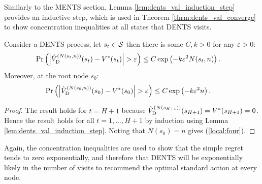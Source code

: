 











    
    
    Similarly to the MENTS section, Lemma \ref{lem:dents_val_induction_step} provides an inductive step, which is used in Theorem \ref{thrm:dents_val_converge} to show concentration inequalities at all states that DENTS visits.
        
    \begin{theorem} \label{thrm:dents_val_converge}
        Consider a DENTS process, let $s_t\in\mathcal{S}$ then there is some $C,k>0$ for any $\varepsilon>0$:
        \begin{align}
            \Pr\left(\left| {\hat{V}^{(N(s_{t},n))}_{{\textnormal{D}}}}(s_t) - V^*(s_{t}) \right| > \varepsilon \right) 
                &\leq C\exp\left( -k\varepsilon^2 N(s_{t},n) \right).
        \end{align}
        Moreover, at the root node $s_0$:
        \begin{align}
            \Pr\left(\left| {\hat{V}^{(N(s_{0},n))}_{{\textnormal{D}}}}(s_0) - V^*(s_0) \right| > \varepsilon \right) 
                &\leq C\exp\left( -k\varepsilon^2 n \right). \label{local:four}
        \end{align}
    \end{theorem}
    \begin{proof}
        The result holds for $t=H+1$  because ${\hat{V}^{(N(s_{H+1}))}_{{\textnormal{D}}}}(s_{H+1})=V^*(s_{H+1})=0$.  Hence the result holds for all $t=1,...,H+1$ by induction using Lemma \ref{lem:dents_val_induction_step}. Noting that $N(s_0)=n$ gives (\ref{local:four}).
    \end{proof}










    Again, the concentration inequalities are used to show that the simple regret tends to zero exponentially, and therefore that DENTS will be exponentially likely in the number of visits to recommend the optimal standard action at every node.
        
